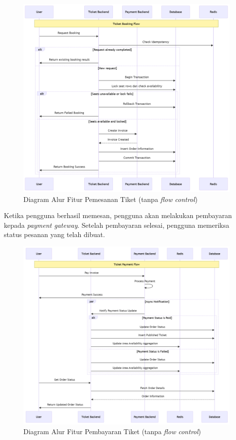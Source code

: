 \begin{figure}[h]
    \centering
    \includegraphics[width=1\textwidth]{resources/chapter-3/book-flow.png}
    \caption{Diagram Alur Fitur Pemesanan Tiket (tanpa \textit{flow control})}
    \label{fig:flow-book-flow}
\end{figure}

\pagebreak

Ketika pengguna berhasil memesan, pengguna akan melakukan pembayaran kepada \textit{payment gateway}. Setelah pembayaran selesai, pengguna memeriksa status pesanan yang telah dibuat.

\begin{figure}[h]
    \centering
    \includegraphics[width=1\textwidth]{resources/chapter-3/order-payment.png}
    \caption{Diagram Alur Fitur Pembayaran Tiket (tanpa \textit{flow control})}
    \label{fig:flow-order-payment-flow}
\end{figure}

